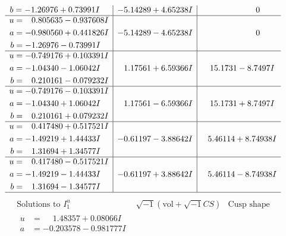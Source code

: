 \documentclass[1p]{elsarticle_modified}
\theoremstyle{definition}
\newcommand{\I}{\sqrt{-1}}
\begin{document}
$$\begin{array}{c|c|c}
\begin{aligned}
b &= -1.26976 + 0.73991 I\end{aligned}
 & -5.14289 + 4.65238 I & \phantom{-0.000000 } 0 \\ \hline\begin{aligned}
u &= \phantom{-}0.805635 - 0.937608 I \\
a &= -0.980560 + 0.441826 I \\
b &= -1.26976 - 0.73991 I\end{aligned}
 & -5.14289 - 4.65238 I & \phantom{-0.000000 } 0 \\ \hline\begin{aligned}
u &= -0.749176 + 0.103391 I \\
a &= -1.04340 - 1.06042 I \\
b &= \phantom{-}0.210161 - 0.079232 I\end{aligned}
 & \phantom{-}1.17561 + 6.59366 I & \phantom{-}15.1731 - 8.7497 I \\ \hline\begin{aligned}
u &= -0.749176 - 0.103391 I \\
a &= -1.04340 + 1.06042 I \\
b &= \phantom{-}0.210161 + 0.079232 I\end{aligned}
 & \phantom{-}1.17561 - 6.59366 I & \phantom{-}15.1731 + 8.7497 I \\ \hline\begin{aligned}
u &= \phantom{-}0.417480 + 0.517521 I \\
a &= -1.49219 + 1.44433 I \\
b &= \phantom{-}1.31694 + 1.34577 I\end{aligned}
 & -0.61197 - 3.88642 I & \phantom{-}5.46114 + 8.74938 I \\ \hline\begin{aligned}
u &= \phantom{-}0.417480 - 0.517521 I \\
a &= -1.49219 - 1.44433 I \\
b &= \phantom{-}1.31694 - 1.34577 I\end{aligned}
 & -0.61197 + 3.88642 I & \phantom{-}5.46114 - 8.74938 I\\
 \hline 
 \end{array}$$\newpage$$\begin{array}{c|c|c}  
\text{Solutions to }I^u_{1}& \I (\text{vol} + \sqrt{-1}CS) & \text{Cusp shape}\\
 \hline 
\begin{aligned}
u &= \phantom{-}1.48357 + 0.08066 I \\
a &= -0.203578 - 0.981777 I \\

\end{aligned}
\end{array}$$
\end{document}
